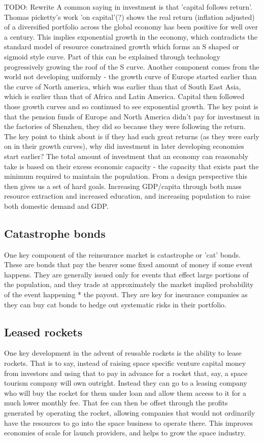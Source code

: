 \documentclass[10pt]{article}
\begin{document}
TODO: Rewrite
A common saying in investment is that 'capital follows return'. Thomas picketty's work 'on capital'(?) shows the real return (inflation adjusted) of a diversified portfolio across the global economy has been positive for well over a century. This implies exponential growth in the economy, which contradicts the standard model of resource constrained growth which forms an S shaped or sigmoid style curve. Part of this can be explained through technology progressively growing the roof of the S curve. Another component comes from the world not developing uniformly - the growth curve of Europe started earlier than the curve of North america, which was earlier than that of South East Asia, which is earlier than that of Africa and Latin America. Capital then followed those growth curves and so continued to see exponential growth. The key point is that the pension funds of Europe and North America didn't pay for investment in the factories of Shenzhen, they did so because they were following the return. The key point to think about is if they had such great returns (as they were early on in their growth curves), why did investment in later developing economies start earlier? The total amount of investment that an economy can reasonably take is based on their excess economic capacity - the capacity that exists past the minimum required to maintain the population. From a design perspective this then gives us a set of hard goals. Increasing GDP/capita through both mass resource extraction and increased education, and increasing population to raise both domestic demand and GDP.

\subsection{Catastrophe bonds}
One key component of the reinsurance market is catastrophe or 'cat' bonds. These are bonds that pay the bearer some fixed amount of money if some event happens. They are generally issued only for events that effect large portions of the population, and they trade at approximately the market implied probability of the event happening * the payout. They are key for insurance companies as they can buy cat bonds to hedge out systematic risks in their portfolio.

\subsection{Leased rockets}
One key development in the advent of reusable rockets is the ability to lease rockets. That is to say, instead of raising space specific venture capital money from investors and using that to pay in advance for a rocket that, say, a space tourism company will own outright. Instead they can go to a leasing company who will buy the rocket for them under loan and allow them access to it for a much lower monthly fee. That fee can then be offset through the profits generated by operating the rocket, allowing companies that would not ordinarily have the resources to go into the space business to operate there. This improves economies of scale for launch providers, and helps to grow the space industry.
\end{document}

